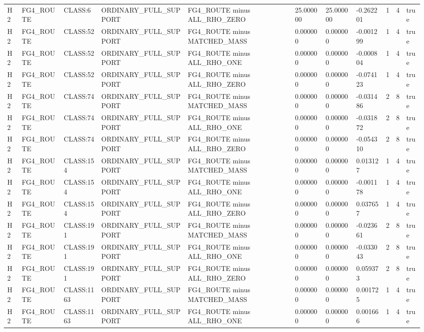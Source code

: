 \begin{tabular}{lllllllllll}
H2 & FG4\_ROUTE & CLASS:6 & ORDINARY\_FULL\_SUPPORT & FG4\_ROUTE minus ALL\_RHO\_ZERO & 25.000000 & 25.000000 & -0.262201 & 1 & 4 & true \\
H2 & FG4\_ROUTE & CLASS:52 & ORDINARY\_FULL\_SUPPORT & FG4\_ROUTE minus MATCHED\_MASS & 0.000000 & 0.000000 & -0.001299 & 1 & 4 & true \\
H2 & FG4\_ROUTE & CLASS:52 & ORDINARY\_FULL\_SUPPORT & FG4\_ROUTE minus ALL\_RHO\_ONE & 0.000000 & 0.000000 & -0.000804 & 1 & 4 & true \\
H2 & FG4\_ROUTE & CLASS:52 & ORDINARY\_FULL\_SUPPORT & FG4\_ROUTE minus ALL\_RHO\_ZERO & 0.000000 & 0.000000 & -0.074123 & 1 & 4 & true \\
H2 & FG4\_ROUTE & CLASS:74 & ORDINARY\_FULL\_SUPPORT & FG4\_ROUTE minus MATCHED\_MASS & 0.000000 & 0.000000 & -0.031486 & 2 & 8 & true \\
H2 & FG4\_ROUTE & CLASS:74 & ORDINARY\_FULL\_SUPPORT & FG4\_ROUTE minus ALL\_RHO\_ONE & 0.000000 & 0.000000 & -0.031872 & 2 & 8 & true \\
H2 & FG4\_ROUTE & CLASS:74 & ORDINARY\_FULL\_SUPPORT & FG4\_ROUTE minus ALL\_RHO\_ZERO & 0.000000 & 0.000000 & -0.054310 & 2 & 8 & true \\
H2 & FG4\_ROUTE & CLASS:154 & ORDINARY\_FULL\_SUPPORT & FG4\_ROUTE minus MATCHED\_MASS & 0.000000 & 0.000000 & 0.013127 & 1 & 4 & true \\
H2 & FG4\_ROUTE & CLASS:154 & ORDINARY\_FULL\_SUPPORT & FG4\_ROUTE minus ALL\_RHO\_ONE & 0.000000 & 0.000000 & -0.001178 & 1 & 4 & true \\
H2 & FG4\_ROUTE & CLASS:154 & ORDINARY\_FULL\_SUPPORT & FG4\_ROUTE minus ALL\_RHO\_ZERO & 0.000000 & 0.000000 & 0.037657 & 1 & 4 & true \\
H2 & FG4\_ROUTE & CLASS:191 & ORDINARY\_FULL\_SUPPORT & FG4\_ROUTE minus MATCHED\_MASS & 0.000000 & 0.000000 & -0.023661 & 2 & 8 & true \\
H2 & FG4\_ROUTE & CLASS:191 & ORDINARY\_FULL\_SUPPORT & FG4\_ROUTE minus ALL\_RHO\_ONE & 0.000000 & 0.000000 & -0.033043 & 2 & 8 & true \\
H2 & FG4\_ROUTE & CLASS:191 & ORDINARY\_FULL\_SUPPORT & FG4\_ROUTE minus ALL\_RHO\_ZERO & 0.000000 & 0.000000 & 0.059373 & 2 & 8 & true \\
H2 & FG4\_ROUTE & CLASS:1163 & ORDINARY\_FULL\_SUPPORT & FG4\_ROUTE minus MATCHED\_MASS & 0.000000 & 0.000000 & 0.001725 & 1 & 4 & true \\
H2 & FG4\_ROUTE & CLASS:1163 & ORDINARY\_FULL\_SUPPORT & FG4\_ROUTE minus ALL\_RHO\_ONE & 0.000000 & 0.000000 & 0.001666 & 1 & 4 & true \\

\end{tabular}
